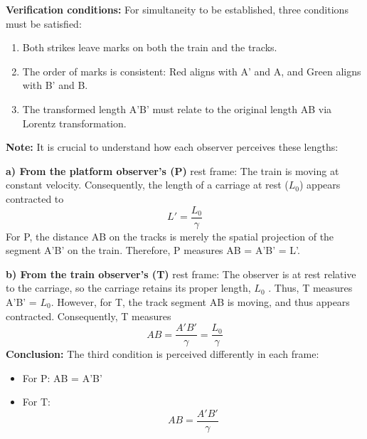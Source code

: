 \documentclass[a4paper,fleqn]{cas-sc}
\begin{document}
		\textbf{Verification conditions:}
 	For simultaneity to be established, three conditions must be satisfied:
		\begin{enumerate}
			\item Both strikes leave marks on both the train and the tracks.
			\item The order of marks is consistent: Red aligns with A' and A, and Green aligns with B' and B.
			\item The transformed length A’B' must relate to the original length AB via Lorentz transformation.
		\end{enumerate}
  		\textbf{Note:}
It is crucial to understand how each observer perceives these lengths:

		\textbf{a) From the platform observer's (P)} rest frame: The train is moving at constant velocity. Consequently, the length of a carriage at rest ($L_0$) appears contracted to 
		\begin{equation*}
  			L'=\frac{L_0}{\gamma}
		\end{equation*}
For P, the distance AB on the tracks is merely the spatial projection of the segment A'B' on the train. Therefore, P measures AB = A'B' = L'.

		\textbf{b) From the train observer's (T)} rest frame: The observer is at rest relative to the carriage, so the carriage retains its proper length, $L_0$ . Thus, T measures A'B' = $L_0$. However, for T, the track segment AB is moving, and thus appears contracted. Consequently, T measures 
		\begin{equation*}
			AB = \frac{A'B'}{\gamma} = \frac{L_0}{\gamma}
		\end{equation*}
		\textbf{Conclusion:} The third condition is perceived differently in each frame:
		\begin{itemize}
			\item	For P: AB = A'B'
			\item	For T: 
  				\begin{equation*}
					AB = \frac{A'B'}{\gamma}
				\end{equation*}
		\end{itemize}
\end{document}
